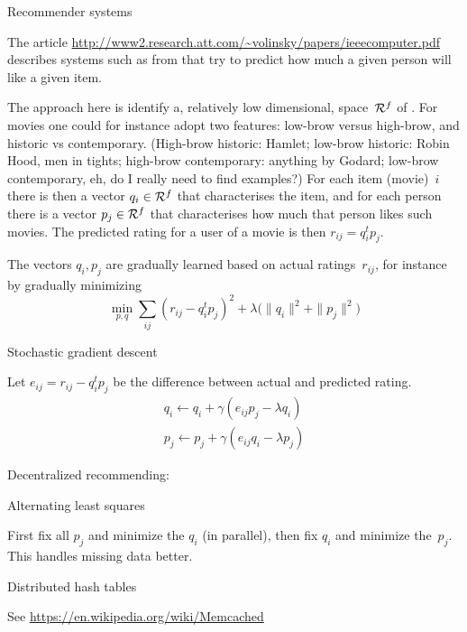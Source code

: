 \cite{Sprint:classifier,ScalParC}

 {Recommender systems}

The article 
\url{http://www2.research.att.com/~volinsky/papers/ieeecomputer.pdf}
describes systems such as from 
that try to predict how much a given person will like a given item.

The approach here is identify a, relatively low dimensional, space~${\cal R}^f$
of . For movies one could for instance adopt two features:
low-brow versus high-brow, and historic vs contemporary.
(High-brow historic: Hamlet; low-brow historic: Robin Hood, men in tights; 
high-brow contemporary: anything by Godard; low-brow contemporary, eh, 
do I really need to find examples?)
For each item (movie)~$i$ there is then a vector $q_i\in{\cal R}^f$ that characterises
the item, and for each person there is a vector $p_j\in{\cal R}^f$ that
characterises how much that person likes such movies. The predicted rating
for a user of a movie is then $r_{ij}=q_i^tp_j$.

The vectors $q_i,p_j$ are gradually learned based on actual
ratings~$r_{ij}$, for instance by gradually minimizing
\[ \min_{p,q} \sum_{ij} (r_{ij}-q_i^tp_j)^2+
    \lambda \bigl( \|q_i\|^2+\|p_j\|^2 \bigr)
\]

 {Stochastic gradient descent}

Let $e_{ij}=r_{ij}-q_i^tp_j$ be the difference between actual and predicted rating.
\[
\begin{array}{l}
  q_i\leftarrow q_i+\gamma (e_{ij}p_j-\lambda q_i)\\
  p_j\leftarrow p_j+\gamma (e_{ij}q_i-\lambda p_j)
\end{array}
\]

Decentralized recommending:~\cite{Zheng:2016arXiv:decentral-recommend}

 {Alternating least squares}

First fix all $p_j$ and minimize the $q_i$ (in parallel),
then fix $q_i$ and minimize the~$p_j$.
This handles missing data better.


 {Distributed hash tables}

See 
\url{https://en.wikipedia.org/wiki/Memcached}
